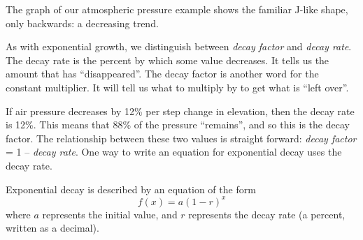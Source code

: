 The graph of our atmospheric pressure example shows the familiar J-like shape, only backwards: a decreasing trend.

\begin{center}
\end{center}

As with exponential growth, we distinguish between \textit{decay factor} and \textit{decay rate}. The decay rate is the percent by which some value decreases. It tells us the amount that has ``disappeared''. The decay factor is another word for the constant multiplier. It will tell us what to multiply by to get what is ``left over''.

If air pressure decreases by 12\% per step change in elevation, then the decay rate is 12\%. This means that 88\% of the pressure ``remains'', and so this is the decay factor. The relationship between these two values is straight forward: \textit{decay factor} = 1 -- \textit{decay rate}. One way to write an equation for exponential decay uses the decay rate.

\begin{boxdef}
Exponential decay is described by an equation of the form \[f(x)=a(1-r)^x\] where $a$ represents the initial value, and $r$ represents the decay rate (a percent, written as a decimal).
\end{boxdef}

